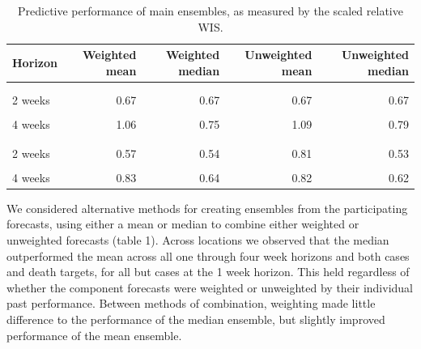 \documentclass[
]{article}
\begin{document}
\begin{table}

\caption{\label{tab:table-1}Predictive performance of main ensembles, as measured by the scaled relative WIS.}
\centering
\begin{tabular}[t]{lrrrr}
\toprule
Horizon & Weighted mean & Weighted median & Unweighted mean & Unweighted median\\
\midrule
\addlinespace[0.3em]
\multicolumn{5}{l}{\textbf{Cases}}\\
\hspace{1em}\cellcolor{gray!6}{1 week} & \cellcolor{gray!6}{0.59} & \cellcolor{gray!6}{0.62} & \cellcolor{gray!6}{0.59} & \cellcolor{gray!6}{0.61}\\
\hspace{1em}2 weeks & 0.67 & 0.67 & 0.67 & 0.67\\
\hspace{1em}\cellcolor{gray!6}{3 weeks} & \cellcolor{gray!6}{0.79} & \cellcolor{gray!6}{0.70} & \cellcolor{gray!6}{0.81} & \cellcolor{gray!6}{0.71}\\
\hspace{1em}4 weeks & 1.06 & 0.75 & 1.09 & 0.79\\
\addlinespace[0.3em]
\multicolumn{5}{l}{\textbf{Deaths}}\\
\hspace{1em}\cellcolor{gray!6}{1 week} & \cellcolor{gray!6}{0.63} & \cellcolor{gray!6}{0.59} & \cellcolor{gray!6}{1.00} & \cellcolor{gray!6}{0.59}\\
\hspace{1em}2 weeks & 0.57 & 0.54 & 0.81 & 0.53\\
\hspace{1em}\cellcolor{gray!6}{3 weeks} & \cellcolor{gray!6}{0.64} & \cellcolor{gray!6}{0.56} & \cellcolor{gray!6}{0.83} & \cellcolor{gray!6}{0.54}\\
\hspace{1em}4 weeks & 0.83 & 0.64 & 0.82 & 0.62\\
\bottomrule
\end{tabular}
\end{table}

We considered alternative methods for creating ensembles from the
participating forecasts, using either a mean or median to combine either
weighted or unweighted forecasts (table 1). Across locations we observed
that the median outperformed the mean across all one through four week
horizons and both cases and death targets, for all but cases at the 1
week horizon. This held regardless of whether the component forecasts
were weighted or unweighted by their individual past performance.
Between methods of combination, weighting made little difference to the
performance of the median ensemble, but slightly improved performance of
the mean ensemble.
\end{document}
